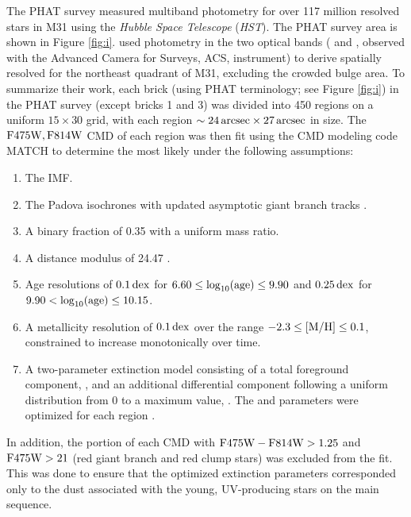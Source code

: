 \documentclass[iop, tighten]{emulateapj}
\begin{document}
The PHAT survey \citep{Dalcanton:2012,Williams:2014} measured multiband
photometry for over 117 million resolved stars in M31 using the \emph{Hubble
Space Telescope} (\emph{HST}). The PHAT survey area is shown in Figure
\ref{fig:i}. \citet{Lewis:2015} used photometry in the two optical bands
(\acsb{} and \acsi{}, observed with the Advanced Camera for Surveys, ACS,
instrument) to derive spatially resolved  for the northeast quadrant of
M31, excluding the crowded bulge area. To summarize their work, each brick
(using PHAT terminology; see Figure \ref{fig:i}) in the PHAT survey (except
bricks 1 and 3) was divided into 450 regions on a uniform $15 \times 30$ grid,
with each region $\sim 24\,\mathrm{arcsec} \times 27\,\mathrm{arcsec}$ in size. The $\mathrm{F475W},\mathrm{F814W}$
CMD of each region was then fit using the CMD modeling code MATCH
\citep{Dolphin:2002} to determine the most likely \sfh{} under the following
assumptions:

\begin{enumerate}
\item The \citet{Kroupa:2001} IMF.
\item The Padova isochrones \citep{Marigo:2008} with updated asymptotic giant
    branch tracks \citep{Girardi:2010}.
\item A binary fraction of 0.35 with a uniform mass ratio.
\item A distance modulus of 24.47 \citep{McConnachie:2005}.
\item Age resolutions of $0.1\,\mathrm{dex}$ for $6.60 \le \log_{10}(\mathrm{age}) \le 9.90$
    and $0.25\,\mathrm{dex}$ for $9.90 < \log_{10}(\mathrm{age}) \le 10.15$.
\item A metallicity resolution of $0.1\,\mathrm{dex}$ over the range $-2.3 \le \mathrm{[M/H]} \le
    0.1$, constrained to increase monotonically over time.
\item A two-parameter extinction model consisting of a total foreground
    component, \avf{}, and an additional differential component following a
    uniform distribution from 0 to a maximum value, \dav{}. The \avf{} and
    \dav{} parameters were optimized for each region \citep[see
    also][]{Simones:2014}.
\end{enumerate}

In addition, the portion of each CMD with $\mathrm{F475W} - \mathrm{F814W} > 1.25$ and $\mathrm{F475W} >
21$ (red giant branch and red clump stars) was excluded from the fit. This was
done to ensure that the optimized extinction parameters corresponded only to the
dust associated with the young, UV-producing stars on the main sequence.
\end{document}
